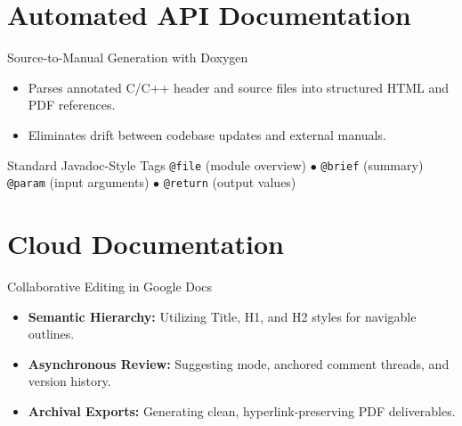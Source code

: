 \documentclass{beamer}
\begin{document}
\section{Automated API Documentation}
\begin{frame}{Source-to-Manual Generation with Doxygen}
  \begin{itemize}
    \item Parses annotated C/C++ header and source files into structured HTML and PDF references.
    \item Eliminates drift between codebase updates and external manuals.
  \end{itemize}
  \vspace{0.2cm}
  \begin{exampleblock}{Standard Javadoc-Style Tags}
    \texttt{@file} (module overview) \quad $\bullet$ \quad \texttt{@brief} (summary) \\
    \texttt{@param} (input arguments) \quad $\bullet$ \quad \texttt{@return} (output values)
  \end{exampleblock}
\end{frame}

\section{Cloud Documentation}
\begin{frame}{Collaborative Editing in Google Docs}
  \begin{itemize}
    \item \textbf{Semantic Hierarchy:} Utilizing Title, H1, and H2 styles for navigable outlines.
    \item \textbf{Asynchronous Review:} Suggesting mode, anchored comment threads, and version history.
    \item \textbf{Archival Exports:} Generating clean, hyperlink-preserving PDF deliverables.
  \end{itemize}
\end{frame}
\end{document}
